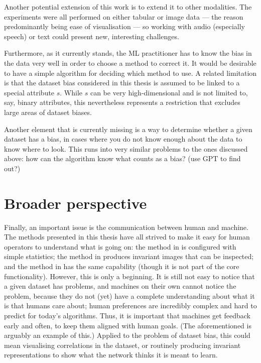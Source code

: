 Another potential extension of this work is to extend it to other modalities.
The experiments were all performed on either tabular or image data
--- the reason predominantly being ease of visualisation ---
so working with audio (especially speech) or text could present new, interesting challenges.

Furthermore, as it currently stands,
the \ac{ML} practitioner has to know the bias in the data very well in order to choose a method to correct it.
It would be desirable to have a simple algorithm for deciding which method to use.
A related limitation is that the dataset bias considered in this thesis
is assumed to be linked to a special attribute \(s\).
While \(s\) can be very high-dimensional and is not limited to, say, binary attributes,
this nevertheless represents a restriction
that excludes large areas of dataset biases.

Another element that is currently missing is a way to determine
whether a given dataset has a bias,
in cases where you do not know enough about the data to know where to look.
This runs into very similar problems to the ones discussed above:
how can the algorithm know what counts as a bias?
(use GPT to find out?)

\section{Broader perspective}\label{sec:broader-perspective}
%
Finally, an important issue is the communication between human and machine.
The methods presented in this thesis have all strived to make it easy for human operators to understand what is going on:
the method in  is configured with simple statistics;
the method in  produces invariant images that can be inspected;
and the method in  has the same capability
(though it is not part of the core functionality).
However, this is only a beginning.
It is still not easy to notice that a given dataset has problems,
and machines on their own cannot notice the problem,
because they do not (yet) have a complete understanding about what it is that humans care about;
human preferences are incredibly complex \citep{yudkowsky2011complex} and hard to predict for today's algorithms.
Thus, it is important that machines get feedback early and often,
to keep them aligned with human goals.
(The aforementioned \citet{stiennon2020learning} is arguably an example of this.)
Applied to the problem of dataset bias,
this could mean visualising correlations in the dataset,
or routinely producing invariant representations to show what the network thinks it is meant to learn.

